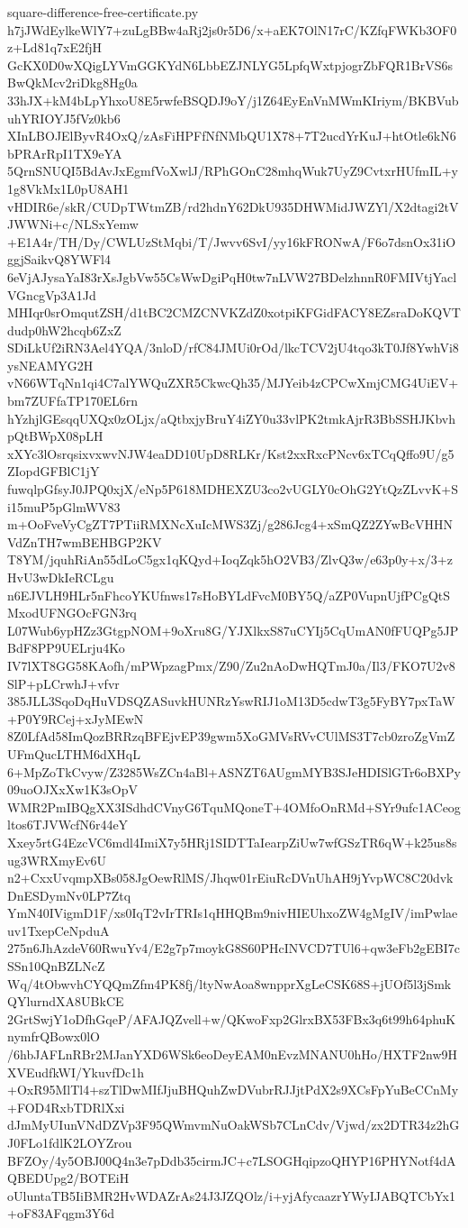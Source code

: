 \documentclass[11pt]{article}
\theoremstyle{definition}
\theoremstyle{remark}
\begin{document}
\begin{filecontents*}[overwrite]{square-difference-free-certificate.py}
h7jJWdEylkeWlY7+zuLgBBw4aRj2js0r5D6/x+aEK7OlN17rC/KZfqFWKb3OF0z+Ld81q7xE2fjH
GcKX0D0wXQigLYVmGGKYdN6LbbEZJNLYG5LpfqWxtpjogrZbFQR1BrVS6sBwQkMcv2riDkg8Hg0a
33hJX+kM4bLpYhxoU8E5rwfeBSQDJ9oY/j1Z64EyEnVnMWmKIriym/BKBVubuhYRIOYJ5fVz0kb6
XInLBOJElByvR4OxQ/zAsFiHPFfNfNMbQU1X78+7T2ucdYrKuJ+htOtle6kN6bPRArRpI1TX9eYA
5QrnSNUQI5BdAvJxEgmfVoXwlJ/RPhGOnC28mhqWuk7UyZ9CvtxrHUfmIL+y1g8VkMx1L0pU8AH1
vHDIR6e/skR/CUDpTWtmZB/rd2hdnY62DkU935DHWMidJWZYl/X2dtagi2tVJWWNi+c/NLSxYemw
+E1A4r/TH/Dy/CWLUzStMqbi/T/Jwvv6SvI/yy16kFRONwA/F6o7dsnOx31iOggjSaikvQ8YWFl4
6eVjAJysaYaI83rXsJgbVw55CsWwDgiPqH0tw7nLVW27BDelzhnnR0FMIVtjYaclVGncgVp3A1Jd
MHIqr0srOmqutZSH/d1tBC2CMZCNVKZdZ0xotpiKFGidFACY8EZsraDoKQVTdudp0hW2hcqb6ZxZ
SDiLkUf2iRN3Ael4YQA/3nloD/rfC84JMUi0rOd/lkcTCV2jU4tqo3kT0Jf8YwhVi8ysNEAMYG2H
vN66WTqNn1qi4C7alYWQuZXR5CkwcQh35/MJYeib4zCPCwXmjCMG4UiEV+bm7ZUFfaTP170EL6rn
hYzhjlGEsqqUXQx0zOLjx/aQtbxjyBruY4iZY0u33vlPK2tmkAjrR3BbSSHJKbvhpQtBWpX08pLH
xXYc3lOsrqsixvxwvNJW4eaDD10UpD8RLKr/Kst2xxRxcPNcv6xTCqQffo9U/g5ZIopdGFBlC1jY
fuwqlpGfsyJ0JPQ0xjX/eNp5P618MDHEXZU3co2vUGLY0cOhG2YtQzZLvvK+Si15muP5pGlmWV83
m+OoFveVyCgZT7PTiiRMXNcXuIcMWS3Zj/g286Jcg4+xSmQZ2ZYwBcVHHNVdZnTH7wmBEHBGP2KV
T8YM/jquhRiAn55dLoC5gx1qKQyd+IoqZqk5hO2VB3/ZlvQ3w/e63p0y+x/3+zHvU3wDkIeRCLgu
n6EJVLH9HLr5nFhcoYKUfnws17sHoBYLdFvcM0BY5Q/aZP0VupnUjfPCgQtSMxodUFNGOcFGN3rq
L07Wub6ypHZz3GtgpNOM+9oXru8G/YJXlkxS87uCYIj5CqUmAN0fFUQPg5JPBdF8PP9UELrju4Ko
IV7lXT8GG58KAofh/mPWpzagPmx/Z90/Zu2nAoDwHQTmJ0a/Il3/FKO7U2v8SlP+pLCrwhJ+vfvr
385JLL3SqoDqHuVDSQZASuvkHUNRzYswRIJ1oM13D5cdwT3g5FyBY7pxTaW+P0Y9RCej+xJyMEwN
8Z0LfAd58ImQozBRRzqBFEjvEP39gwm5XoGMVsRVvCUlMS3T7cb0zroZgVmZUFmQucLTHM6dXHqL
6+MpZoTkCvyw/Z3285WsZCn4aBl+ASNZT6AUgmMYB3SJeHDISlGTr6oBXPy09uoOJXxXw1K3sOpV
WMR2PmIBQgXX3ISdhdCVnyG6TquMQoneT+4OMfoOnRMd+SYr9ufc1ACeogltos6TJVWcfN6r44eY
Xxey5rtG4EzcVC6mdl4ImiX7y5HRj1SIDTTaIearpZiUw7wfGSzTR6qW+k25us8sug3WRXmyEv6U
n2+CxxUvqmpXBs058JgOewRlMS/Jhqw01rEiuRcDVnUhAH9jYvpWC8C20dvkDnESDymNv0LP7Ztq
YmN40IVigmD1F/xs0IqT2vIrTRIs1qHHQBm9nivHIEUhxoZW4gMgIV/imPwlaeuv1TxepCeNpduA
275n6JhAzdeV60RwuYv4/E2g7p7moykG8S60PHcINVCD7TUl6+qw3eFb2gEBI7cSSn10QnBZLNcZ
Wq/4tObwvhCYQQmZfm4PK8fj/ltyNwAoa8wnpprXgLeCSK68S+jUOf5l3jSmkQYlurndXA8UBkCE
2GrtSwjY1oDfhGqeP/AFAJQZvell+w/QKwoFxp2GlrxBX53FBx3q6t99h64phuKnymfrQBowx0lO
/6hbJAFLnRBr2MJanYXD6WSk6eoDeyEAM0nEvzMNANU0hHo/HXTF2nw9HXVEudfkWI/YkuvfDc1h
+OxR95MlTl4+szTlDwMIfJjuBHQuhZwDVubrRJJjtPdX2s9XCsFpYuBeCCnMy+FOD4RxbTDRlXxi
dJmMyUIunVNdDZVp3F95QWmvmNuOakWSb7CLnCdv/Vjwd/zx2DTR34z2hGJ0FLo1fdlK2LOYZrou
BFZOy/4y5OBJ00Q4n3e7pDdb35cirmJC+c7LSOGHqipzoQHYP16PHYNotf4dAQBEDUpg2/BOTEiH
oUluntaTB5IiBMR2HvWDAZrAs24J3JZQOlz/i+yjAfycaazrYWyIJABQTCbYx1+oF83AFqgm3Y6d

\end{filecontents*}
\end{document}
